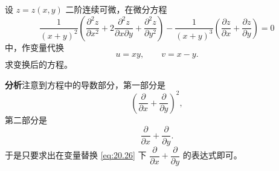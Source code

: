 \begin{xexample}[20.5.1]
设 $z=z(x,y)$ 二阶连续可微，在微分方程
\[
  \frac1{(x+y)^2}\left(
    \frac{\partial^2z}{\partial x^2}
    +2\frac{\partial^2z}{\partial x\partial y}
    +\frac{\partial^2z}{\partial y^2}
  \right)
  -\frac1{(x+y)^3}\left(
    \frac{\partial z}{\partial x}+\frac{\partial z}{\partial y}
  \right)=0
\]
中，作变量代换
\begin{equation}
  u=xy,\qquad v=x-y.
  \tag{20.26}
  \label{eq:20.26}
\end{equation}
求变换后的方程。
\end{xexample}
\begin{xsolution}
\textbf{分析}\quad 注意到方程中的导数部分，第一部分是
\[
  \left(\frac\partial{\partial x}+\frac\partial{\partial y}\right)^2,
\]
第二部分是
\[
  \frac\partial{\partial x}+\frac\partial{\partial y}.
\]
于是只要求出在变量替换 \eqref{eq:20.26} 下 $\dfrac\partial{\partial x}+\dfrac\partial{\partial y}$ 的表达式即可。


\end{xsolution}
